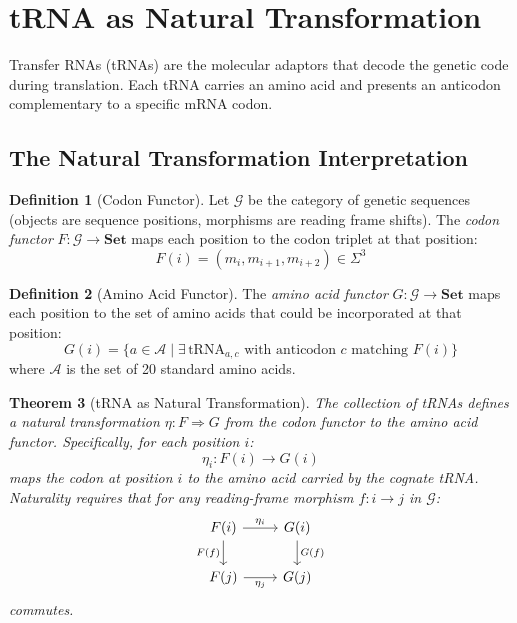 \documentclass[12pt,a4paper]{article}
\newtheorem{theorem}{Theorem}[section]
\theoremstyle{definition}
\newtheorem{definition}[theorem]{Definition}
\newcommand{\Set}{\mathbf{Set}}
\begin{document}
\section{tRNA as Natural Transformation}\label{sec:trna}

Transfer RNAs (tRNAs) are the molecular adaptors that decode the
genetic code during translation.  Each tRNA carries an amino acid and
presents an anticodon complementary to a specific mRNA codon.

\subsection{The Natural Transformation Interpretation}

\begin{definition}[Codon Functor]\label{def:codon-functor}
Let $\mathcal{G}$ be the category of genetic sequences (objects are
sequence positions, morphisms are reading frame shifts).  The
\emph{codon functor} $F : \mathcal{G} \to \Set$ maps each position
to the codon triplet at that position:
\[
  F(i) = (m_i, m_{i+1}, m_{i+2}) \in \Sigma^3
\]
\end{definition}

\begin{definition}[Amino Acid Functor]\label{def:aa-functor}
The \emph{amino acid functor} $G : \mathcal{G} \to \Set$ maps each
position to the set of amino acids that could be incorporated at
that position:
\[
  G(i) = \{a \in \mathcal{A} \mid \exists\, \text{tRNA}_{a,c} \text{ with anticodon } c \text{ matching } F(i)\}
\]
where $\mathcal{A}$ is the set of 20 standard amino acids.
\end{definition}

\begin{theorem}[tRNA as Natural Transformation]\label{thm:trna-nat}
The collection of tRNAs defines a natural transformation
$\eta : F \Rightarrow G$ from the codon functor to the amino acid
functor.  Specifically, for each position $i$:
\[
  \eta_i : F(i) \to G(i)
\]
maps the codon at position $i$ to the amino acid carried by the
cognate tRNA.  Naturality requires that for any reading-frame morphism
$f : i \to j$ in $\mathcal{G}$:
\[
\begin{tikzcd}
  F(i) \arrow[r, "\eta_i"] \arrow[d, "F(f)"'] & G(i) \arrow[d, "G(f)"] \\
  F(j) \arrow[r, "\eta_j"'] & G(j)
\end{tikzcd}
\]
commutes.
\end{theorem}
\end{document}
